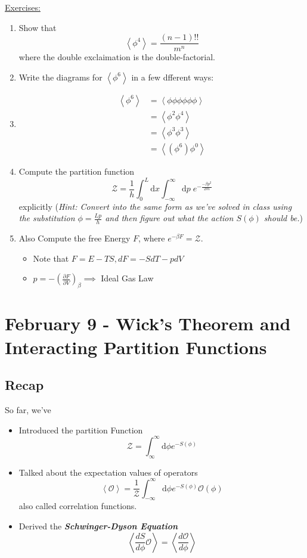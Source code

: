 \documentclass{article}
\newcommand{\cO}{\mathcal{O}}
\newcommand{\cZ}{\mathcal{Z}}
\newcommand{\mean}[1]{\left\langle #1 \right\rangle}
\begin{document}
\vskip 0.5cm
\begin{dottedbox}
  \underline{Exercises:}
  \begin{enumerate}
    \item Show that 
    \[ \mean{\phi^4} = \frac{(n - 1)!!}{m^n} \] where the double exclaimation is the double-factorial.

  \vskip 0.5cm
  \item Write the diagrams for $\mean{\phi^6}$ in a few dfferent ways:
  \item \begin{align*}
    \mean{\phi^6} &= \mean{\phi \phi \phi \phi \phi \phi} \\
    &= \mean{\phi^2 \phi^4} \\
    &= \mean{\phi^3 \phi^3} \\
    &= \mean{(\phi^6) \phi^0}
  \end{align*}

  \vskip 0.5cm
  \item Compute the partition function
  \[ \mathcal{Z} = \frac{1}{h} \int_0^{L} \mathrm{d}x \int_{-\infty}^{\infty} \mathrm{d}p\;e^{-\frac{-\beta p^2}{2m}} \]
  explicitly (\emph{Hint: Convert into the same form as we've solved in class using the substitution $\phi = \frac{Lp}{h}$ and then figure out what the action $S(\phi)$ should be.})

  \item Also Compute the free Energy $F$, where $e^{-\beta F} = \mathcal{Z}$.
  \begin{itemize}
    \item Note that $F =  E - TS, dF = -S dT - pdV$
    \item $p = -\left( \frac{\partial F}{\partial V} \right)_{\beta} \implies$ Ideal Gas Law
  \end{itemize}
  \end{enumerate}
\end{dottedbox}

\pagebreak

\section{February 9 - Wick's Theorem and Interacting Partition Functions}

\subsection*{Recap}
So far, we've
\begin{itemize}
  \item Introduced the partition Function
  \[ \cZ = \int_{\infty}^{\infty} \mathrm{d} \phi e^{-S(\phi)} \]

  \item Talked about the expectation values of operators
  \[ \mean{\cO} =\frac{1}{\cZ} \int_{-\infty}^{\infty} \mathrm{d}\phi e^{-S(\phi)} \cO(\phi) \]
  also called correlation functions.

  \item Derived the \emph{\textbf{Schwinger-Dyson Equation}} 
  \[ \left\langle \frac{dS}{d\phi} \cO \right\rangle = \left\langle \frac{d\cO}{d\phi}  \right\rangle  \]
\end{itemize}
\end{document}
